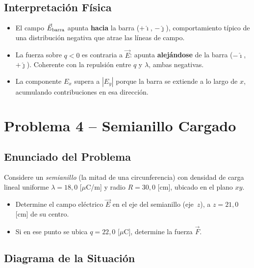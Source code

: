 \documentclass[12pt,letterpaper]{article}
\begin{document}
\subsection*{Interpretaci\'on F\'isica}

\begin{itemize}
    \item El campo $\vec{E}_{\rm barra}$ apunta \textbf{hacia} la barra ($+\hat{\imath}$, $-\hat{\jmath}$),
          comportamiento t\'ipico de una distribuci\'on negativa que atrae las l\'ineas de campo.
    \item La fuerza sobre $q < 0$ es contraria a $\vec{E}$: apunta \textbf{alejándose} de la barra
          ($-\hat{\imath}$, $+\hat{\jmath}$). Coherente con la repulsi\'on entre $q$ y $\lambda$,
          ambas negativas.
    \item La componente $E_x$ supera a $|E_y|$ porque la barra se extiende a lo largo de $x$,
          acumulando contribuciones en esa direcci\'on.
\end{itemize}

\newpage
\section*{\textcolor{ubbblue}{Problema 4 \;--\; Semianillo Cargado}}

\subsection*{Enunciado del Problema}

Considere un \emph{semianillo} (la mitad de una circunferencia) con densidad de carga lineal
uniforme $\lambda = 18{,}0$ [$\mu$C/m] y radio $R = 30{,}0$ [cm], ubicado en el plano $xy$.
\begin{itemize}
    \item Determine el campo el\'ectrico $\vec{E}$ en el eje del semianillo (eje~$z$), a
          $z = 21{,}0$ [cm] de su centro.
    \item Si en ese punto se ubica $q = 22{,}0$ [$\mu$C], determine la fuerza $\vec{F}$.
\end{itemize}

\subsection*{Diagrama de la Situaci\'on}
\end{document}
